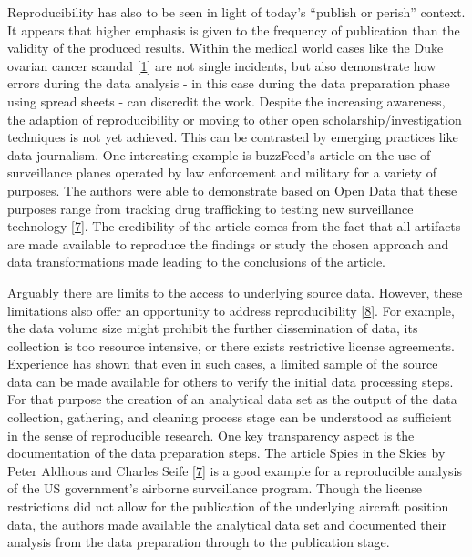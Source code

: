 \documentclass[conference,final,a4paper,]{IEEEtran}
\begin{document}
Reproducibility has also to be seen in light of today's ``publish or
perish'' context. It appears that higher emphasis is given to the
frequency of publication than the validity of the produced results.
Within the medical world cases like the Duke ovarian cancer scandal
{[}\protect\hyperlink{ref-kolata_2011}{1}{]} are not single incidents,
but also demonstrate how errors during the data analysis - in this case
during the data preparation phase using spread sheets - can discredit
the work. Despite the increasing awareness, the adaption of
reproducibility or moving to other open scholarship/investigation
techniques is not yet achieved. This can be contrasted by emerging
practices like data journalism. One interesting example is buzzFeed's
article on the use of surveillance planes operated by law enforcement
and military for a variety of purposes. The authors were able to
demonstrate based on Open Data that these purposes range from tracking
drug trafficking to testing new surveillance technology
{[}\protect\hyperlink{ref-peteraldhous_2016}{7}{]}. The credibility of
the article comes from the fact that all artifacts are made available to
reproduce the findings or study the chosen approach and data
transformations made leading to the conclusions of the article.

Arguably there are limits to the access to underlying source data.
However, these limitations also offer an opportunity to address
reproducibility {[}\protect\hyperlink{ref-koelle_open_2017}{8}{]}. For
example, the data volume size might prohibit the further dissemination
of data, its collection is too resource intensive, or there exists
restrictive license agreements. Experience has shown that even in such
cases, a limited sample of the source data can be made available for
others to verify the initial data processing steps. For that purpose the
creation of an analytical data set as the output of the data collection,
gathering, and cleaning process stage can be understood as sufficient in
the sense of reproducible research. One key transparency aspect is the
documentation of the data preparation steps. The article Spies in the
Skies by Peter Aldhous and Charles Seife
{[}\protect\hyperlink{ref-peteraldhous_2016}{7}{]} is a good example for
a reproducible analysis of the US government's airborne surveillance
program. Though the license restrictions did not allow for the
publication of the underlying aircraft position data, the authors made
available the analytical data set and documented their analysis from the
data preparation through to the publication stage.
\end{document}
